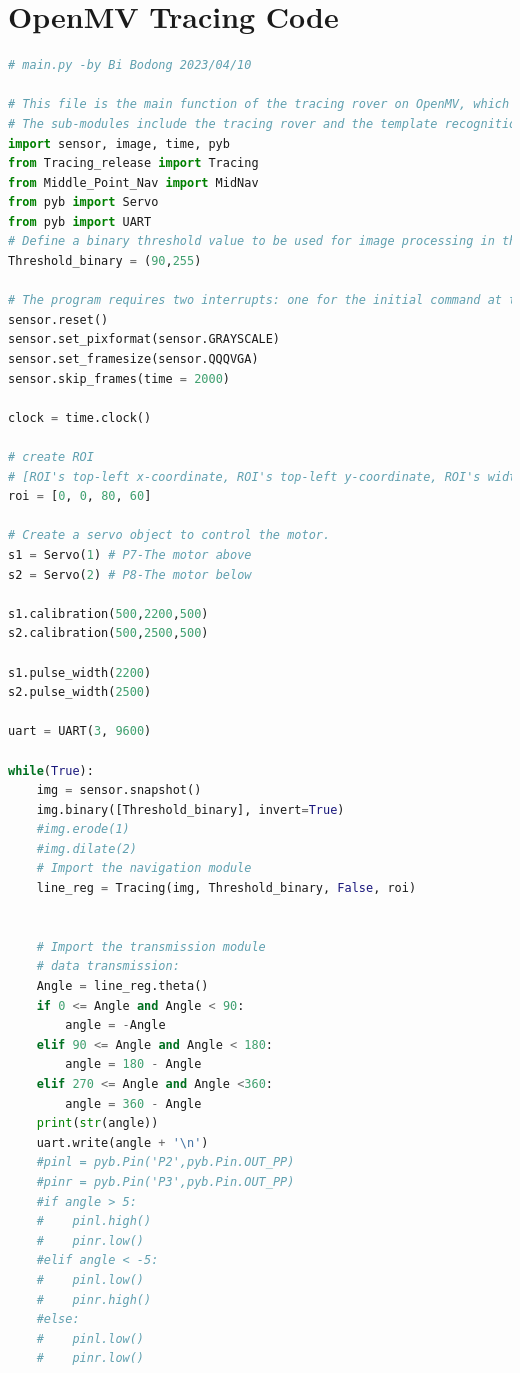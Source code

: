 \documentclass[12pt, a4paper, oneside]{report}
\begin{document}
\section*{OpenMV Tracing Code}
\begin{lstlisting}[language=Python]
# main.py -by Bi Bodong 2023/04/10

# This file is the main function of the tracing rover on OpenMV, which can coordinate various sub-modules to perform navigation tasks.
# The sub-modules include the tracing rover and the template recognition module.
import sensor, image, time, pyb
from Tracing_release import Tracing
from Middle_Point_Nav import MidNav
from pyb import Servo
from pyb import UART
# Define a binary threshold value to be used for image processing in the tracing module.
Threshold_binary = (90,255)

# The program requires two interrupts: one for the initial command at the start and another for the command when entering the template recognition state. These commands should be sent from the STM32 to the OpenMV.
sensor.reset()
sensor.set_pixformat(sensor.GRAYSCALE)
sensor.set_framesize(sensor.QQQVGA)
sensor.skip_frames(time = 2000)

clock = time.clock()

# create ROI
# [ROI's top-left x-coordinate, ROI's top-left y-coordinate, ROI's width, ROI's height]
roi = [0, 0, 80, 60]

# Create a servo object to control the motor.
s1 = Servo(1) # P7-The motor above
s2 = Servo(2) # P8-The motor below

s1.calibration(500,2200,500)
s2.calibration(500,2500,500)

s1.pulse_width(2200)
s2.pulse_width(2500)

uart = UART(3, 9600)

while(True):
    img = sensor.snapshot()
    img.binary([Threshold_binary], invert=True)
    #img.erode(1)
    #img.dilate(2)
    # Import the navigation module
    line_reg = Tracing(img, Threshold_binary, False, roi)

    
    # Import the transmission module
    # data transmission:
    Angle = line_reg.theta()
    if 0 <= Angle and Angle < 90:
        angle = -Angle
    elif 90 <= Angle and Angle < 180:
        angle = 180 - Angle
    elif 270 <= Angle and Angle <360:
        angle = 360 - Angle
    print(str(angle))
    uart.write(angle + '\n')
    #pinl = pyb.Pin('P2',pyb.Pin.OUT_PP)
    #pinr = pyb.Pin('P3',pyb.Pin.OUT_PP)
    #if angle > 5:
    #    pinl.high()
    #    pinr.low()
    #elif angle < -5:
    #    pinl.low()
    #    pinr.high()
    #else:
    #    pinl.low()
    #    pinr.low()
\end{lstlisting}
\end{document}
